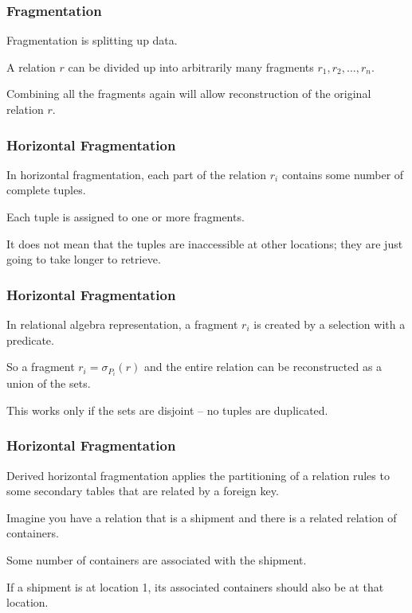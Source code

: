 \begin{frame}
\frametitle{Fragmentation}

Fragmentation is splitting up data. 

A relation $r$ can be divided up into arbitrarily many fragments $r_{1}, r_{2}, ..., r_{n}$.

Combining all the fragments again will allow reconstruction of the original relation $r$. 


\end{frame}


\begin{frame}
\frametitle{Horizontal Fragmentation}

In \alert{horizontal fragmentation}, each part of the relation $r_{i}$ contains some number of complete tuples. 

Each tuple is assigned to one or more fragments.

It does not mean that the tuples are inaccessible at other locations; they are just going to take longer to retrieve.

\end{frame}

\begin{frame}
\frametitle{Horizontal Fragmentation}

In relational algebra representation, a fragment $r_{i}$ is created by a selection with a predicate. 

So a fragment $r_{i} = \sigma_{P_{i}}(r)$ and the entire relation can be reconstructed as a union of the sets. 

This works only if the sets are disjoint -- no tuples are duplicated. 

\end{frame}


\begin{frame}
\frametitle{Horizontal Fragmentation}

\alert{Derived horizontal fragmentation} applies the partitioning of a relation rules to some secondary tables that are related by a foreign key. 

Imagine you have a relation that is a shipment and there is a related relation of containers. 

Some number of containers are associated with the shipment.

If a shipment is at location 1, its associated containers should also be at that location.

\end{frame}

